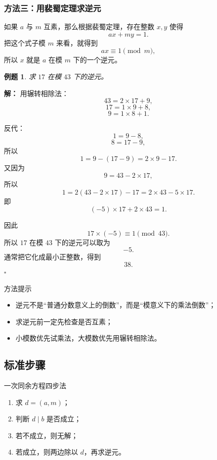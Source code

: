 \documentclass[11pt,a4paper,fontset=fandol]{ctexart}
\theoremstyle{formaltheorem}
\theoremstyle{formalexample}
\newtheorem{example}{例题}[section]
\newenvironment{solution}{\par\noindent\textbf{解：}}{\hfill$\square$\par}
\begin{document}
\subsubsection{方法三：用裴蜀定理求逆元}

如果 $a$ 与 $m$ 互素，那么根据裴蜀定理，存在整数 $x,y$ 使得
\[
ax+my=1.
\]
把这个式子模 $m$ 来看，就得到
\[
ax\equiv 1\pmod m,
\]
所以 $x$ 就是 $a$ 在模 $m$ 下的一个逆元。

\begin{example}
求 $17$ 在模 $43$ 下的逆元。
\end{example}

\begin{solution}
用辗转相除法：
\[
43=2\times 17+9,
\]
\[
17=1\times 9+8,
\]
\[
9=1\times 8+1.
\]

反代：
\[
1=9-8,
\]
\[
8=17-9,
\]
所以
\[
1=9-(17-9)=2\times 9-17.
\]
又因为
\[
9=43-2\times 17,
\]
所以
\[
1=2(43-2\times 17)-17=2\times 43-5\times 17.
\]
即
\[
(-5)\times 17+2\times 43=1.
\]

因此
\[
17\times(-5)\equiv 1\pmod{43}.
\]
所以 $17$ 在模 $43$ 下的逆元可以取为
\[
\boxed{-5}.
\]
通常把它化成最小正整数，得到
\[
\boxed{38}.
\]
\end{solution}

\begin{notebox}{方法提示}
\begin{itemize}
  \item 逆元不是“普通分数意义上的倒数”，而是“模意义下的乘法倒数”；
  \item 求逆元前一定先检查是否互素；
  \item 小模数优先试乘法，大模数优先用辗转相除法。
\end{itemize}
\end{notebox}

\subsection{标准步骤}

\begin{goalbox}{一次同余方程四步法}
\begin{enumerate}
  \item 求 $d=(a,m)$；
  \item 判断 $d\mid b$ 是否成立；
  \item 若不成立，则无解；
  \item 若成立，则两边除以 $d$，再求逆元。
\end{enumerate}
\end{goalbox}
\end{document}
